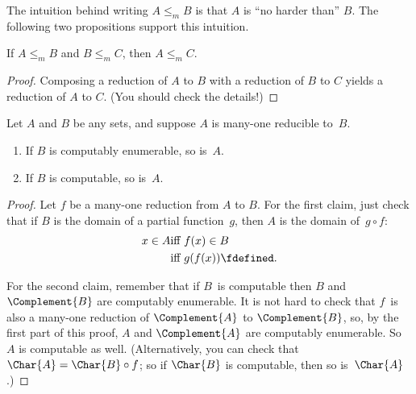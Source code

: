 \documentclass[../../../include/open-logic-section]{subfiles}
\begin{document}

The intuition behind writing $A \leq_m B$ is that $A$ is ``no harder
than'' $B$. The following two propositions support this intuition.

\begin{prop}
If $A \leq_m B$ and $B \leq_m C$, then $A \leq_m C$.
\end{prop}

\begin{proof}
Composing a reduction of $A$ to $B$ with a reduction of $B$ to
$C$ yields a reduction of $A$ to $C$. (You should check the details!{})
\end{proof}

\begin{prop}
Let $A$ and $B$ be any sets, and suppose $A$ is many-one reducible to~$B$.
\begin{enumerate}
\item If $B$ is computably enumerable, so is~$A$.
\item If $B$ is computable, so is~$A$.
\end{enumerate}
\end{prop}

\begin{proof}
Let $f$ be a many-one reduction from $A$ to $B$. For the first
claim, just check that if $B$ is the domain of a partial function~$g$,
then $A$ is the domain of~$g \circ f$:
\begin{align*}
x \in A & \text{iff } f(x) \in B \\
& \text{iff }  g(f(x)) \fdefined.
\end{align*}

For the second claim, remember that if $B$~is computable then $B$
and~$\Complement{B}$ are computably enumerable. It is not hard to
check that $f$~is also a many-one reduction of $\Complement{A}$ to
$\Complement{B}$, so, by the first part of this proof, $A$ and
$\Complement{A}$ are computably enumerable. So $A$ is computable as
well. (Alternatively, you can check that $\Char{A} = \Char{B} \circ
f$; so if $\Char{B}$ is computable, then so is~$\Char{A}$.)
\end{proof}
\end{document}
